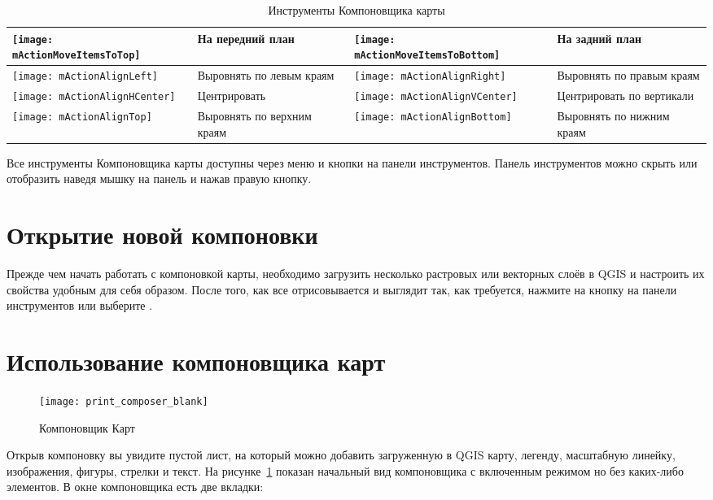 \begin{table}[h]
\begin{tabular}{|m{1cm}|m{5.4cm}|m{1cm}|m{5.4cm}|}
 \hline \texttt{[image: mActionMoveItemsToTop]} & На передний
 план &
 \texttt{[image: mActionMoveItemsToBottom]} & На задний
 план \\
 \hline \texttt{[image: mActionAlignLeft]} & Выровнять по
 левым краям &
 \texttt{[image: mActionAlignRight]} & Выровнять по правым
 краям \\
 \hline \texttt{[image: mActionAlignHCenter]} & Центрировать &
 \texttt{[image: mActionAlignVCenter]} & Центрировать по
 вертикали \\
 \hline \texttt{[image: mActionAlignTop]} & Выровнять по верхним
 краям &
 \texttt{[image: mActionAlignBottom]} & Выровнять по нижним
 краям \\
\hline
\end{tabular}
\caption{Инструменты Компоновщика карты}\label{tab:printcomposer_tools}
\end{table}

Все инструменты Компоновщика карты доступны через меню и кнопки на
панели инструментов. Панель инструментов можно скрыть или отобразить
наведя мышку на панель и нажав правую кнопку.

\section{Открытие новой компоновки}\label{composertemplates}

Прежде чем начать работать с компоновкой карты, необходимо загрузить
несколько растровых или векторных слоёв в QGIS и настроить их свойства
удобным для себя образом. После того, как все отрисовывается и выглядит
так, как требуется, нажмите на кнопку
 на панели
инструментов или выберите  \arrow
{}.

\section{Использование компоновщика карт}\label{label_useprintcomposer}

\begin{figure}[ht]
   \centering
   \texttt{[image: print\_composer\_blank]}
   \caption{Компоновщик Карт \wincaption}\label{fig:print_composer_blank}
\end{figure}

Открыв компоновку вы увидите пустой лист, на который можно добавить
загруженную в QGIS карту, легенду, масштабную линейку, изображения,
фигуры, стрелки и текст. На рисунке~\ref{fig:print_composer_blank}
показан начальный вид компоновщика с включенным режимом
 но без каких-либо элементов. В окне
компоновщика есть две вкладки:

